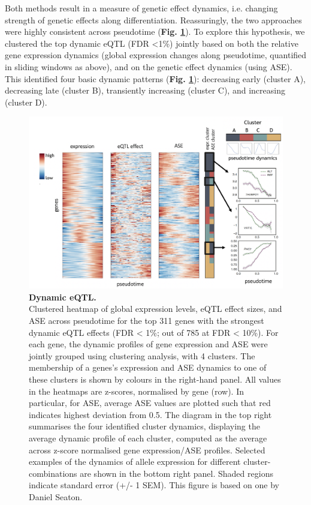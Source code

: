 Both methods result in a measure of genetic effect dynamics, i.e. changing strength of genetic effects along differentiation. 
Reassuringly, the two approaches were highly consistent across pseudotime (\textbf{Fig. \ref{fig:endodiff_dynamic_eqtl}}).
To explore this hypothesis, we clustered the top dynamic eQTL (FDR <1\%) jointly based on both the relative gene expression dynamics (global expression changes along pseudotime, quantified in sliding windows as above), and on the genetic effect dynamics (using ASE). 
This identified four basic dynamic patterns (\textbf{Fig. \ref{fig:endodiff_dynamic_eqtl}}): decreasing early (cluster A), decreasing late (cluster B), transiently increasing (cluster C), and increasing (cluster D). 
\begin{figure}[htbp]
\centering
\includegraphics[width=15.5cm]{Chapter4/Fig/endodiff_pseudo_heatmap.png}
\caption[Dynamic eQTL]{\textbf{Dynamic eQTL.}\\
Clustered heatmap of global expression levels, eQTL effect sizes, and ASE across pseudotime for the top 311 genes with the strongest dynamic eQTL effects (FDR < 1\%; out of 785 at FDR < 10\%). 
For each gene, the dynamic profiles of gene expression and ASE were jointly grouped using clustering analysis, with 4 clusters. 
The membership of a genes's expression and ASE dynamics to one of these clusters is shown by colours in the right-hand panel. 
All values in the heatmaps are z-scores, normalised by gene (row). 
In particular, for ASE, average ASE values are plotted such that red indicates highest deviation from 0.5.
The diagram in the top right summarises the four identified cluster dynamics, displaying the average dynamic profile of each cluster, computed as the average across z-score normalised gene expression/ASE profiles. 
Selected examples of the dynamics of allele expression for different cluster-combinations are shown in the bottom right panel.
Shaded regions indicate standard error (+/- 1 SEM).
This figure is based on one by Daniel Seaton.}
\label{fig:endodiff_dynamic_eqtl}
\end{figure}
